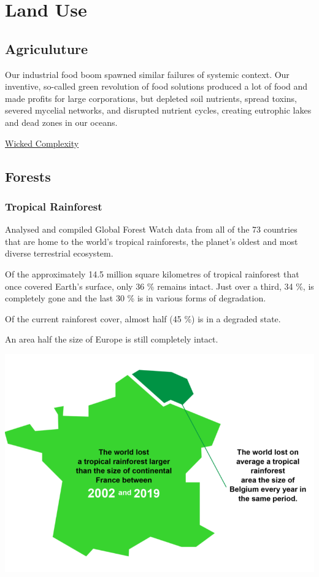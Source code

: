 \documentclass[
]{book}
\begin{document}
\hypertarget{land-use}{%
\chapter{Land Use}\label{land-use}}

\hypertarget{agriculuture}{%
\section{Agriculuture}\label{agriculuture}}

Our industrial food boom spawned similar failures of systemic context. Our inventive, so-called green revolution of food solutions produced a lot of food and made profits for large corporations, but depleted soil nutrients, spread toxins, severed mycelial networks, and disrupted nutrient cycles, creating eutrophic lakes and dead zones in our oceans.

\href{https://mahb.stanford.edu/blog/thresholds-cascades-and-wicked-problems/}{Wicked Complexity}

\hypertarget{forests}{%
\section{Forests}\label{forests}}

\hypertarget{tropical-rainforest}{%
\subsection{Tropical Rainforest}\label{tropical-rainforest}}

Analysed and compiled Global Forest Watch data from all of the 73 countries
that are home to the world's tropical rainforests,
the planet's oldest and most diverse terrestrial ecosystem.

Of the approximately 14.5 million square kilometres of tropical rainforest that once covered Earth's surface, only 36 \% remains intact. Just over a third, 34 \%, is completely gone and the last 30 \% is in various forms of degradation.

Of the current rainforest cover, almost half (45 \%) is in a degraded state.

An area half the size of Europe is still completely intact.

\includegraphics{fig/rainforest_loss_as_france_belgium.png}
\end{document}
